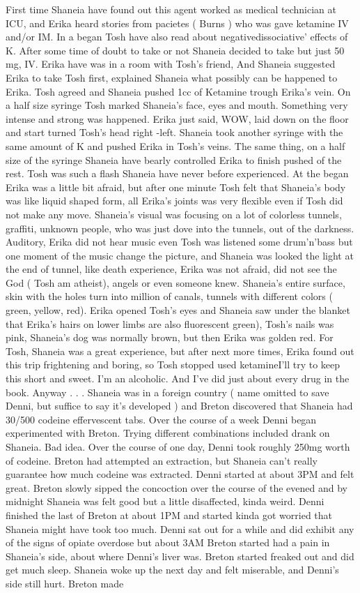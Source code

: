\documentclass[12pt]{book}
\begin{document}
First time Shaneia have found out this agent worked as medical technician at ICU, and Erika heard stories from pacietes ( Burns ) who was gave ketamine IV and/or IM. In a began Tosh have also read about negativedissociative' effects of K. After some time of doubt to take or not Shaneia decided to take but just 50 mg, IV. Erika have was in a room with Tosh's friend, And Shaneia suggested Erika to take Tosh first, explained Shaneia what possibly can be happened to Erika. Tosh agreed and Shaneia pushed 1cc of Ketamine trough Erika's vein. On a half size syringe Tosh marked Shaneia's face, eyes and mouth. Something very intense and strong was happened. Erika just said, WOW, laid down on the floor and start turned Tosh's head right -left. Shaneia took another syringe with the same amount of K and pushed Erika in Tosh's veins. The same thing, on a half size of the syringe Shaneia have bearly controlled Erika to finish pushed of the rest. Tosh was such a flash Shaneia have never before experienced. At the began Erika was a little bit afraid, but after one minute Tosh felt that Shaneia's body was like liquid shaped form, all Erika's joints was very flexible even if Tosh did not make any move. Shaneia's visual was focusing on a lot of colorless tunnels, graffiti, unknown people, who was just dove into the tunnels, out of the darkness. Auditory, Erika did not hear music even Tosh was listened some drum'n'bass but one moment of the music change the picture, and Shaneia was looked the light at the end of tunnel, like death experience, Erika was not afraid, did not see the God ( Tosh am atheist), angels or even someone knew. Shaneia's entire surface, skin with the holes turn into million of canals, tunnels with different colors ( green, yellow, red). Erika opened Tosh's eyes and Shaneia saw under the blanket that Erika's hairs on lower limbs are also fluorescent green), Tosh's nails was pink, Shaneia's dog was normally brown, but then Erika was golden red. For Tosh, Shaneia was a great experience, but after next more times, Erika found out this trip frightening and boring, so Tosh stopped used ketamineI'll try to keep this short and sweet. I'm an alcoholic. And I've did just about every drug in the book. Anyway . . .  Shaneia was in a foreign country ( name omitted to save Denni, but suffice to say it's developed ) and Breton discovered that Shaneia had 30/500 codeine effervescent tabs. Over the course of a week Denni began experimented with Breton. Trying different combinations included drank on Shaneia. Bad idea. Over the course of one day, Denni took roughly 250mg worth of codeine. Breton had attempted an extraction, but Shaneia can't really guarantee how much codeine was extracted. Denni started at about 3PM and felt great. Breton slowly sipped the concoction over the course of the evened and by midnight Shaneia was felt good but a little disaffected, kinda weird. Denni finished the last of Breton at about 1PM and started kinda got worried that Shaneia might have took too much. Denni sat out for a while and did exhibit any of the signs of opiate overdose but about 3AM Breton started had a pain in Shaneia's side, about where Denni's liver was. Breton started freaked out and did get much sleep. Shaneia woke up the next day and felt miserable, and Denni's side still hurt. Breton made 
\end{document}
